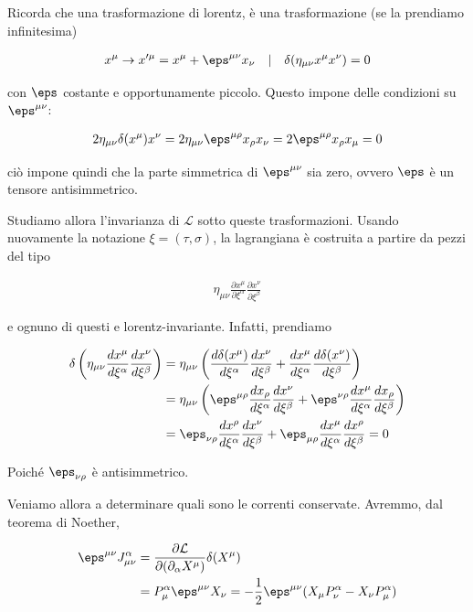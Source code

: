 \documentclass{report}
\begin{document}
Ricorda che una trasformazione di lorentz, è una trasformazione (se la prendiamo infinitesima)

\begin{align}
    x^\mu \rightarrow x'^\mu = x^\mu + \eps^{\mu\nu}x_\nu \quad | \quad \delta(\eta_{\mu\nu}x^\mu x^\nu) = 0 
\end{align}

con \(\eps\) costante e opportunamente piccolo. Questo impone delle condizioni su \(\eps^{\mu\nu}\): 

\begin{align}
    2\eta_{\mu\nu}\delta(x^\mu)x^\nu = 2\eta_{\mu\nu}\eps^{\mu\rho}x_\rho x_\nu = 2 \eps^{\mu\rho}x_\rho x_\mu = 0 
\end{align}

ciò impone quindi che la parte simmetrica di \(\eps^{\mu\nu}\) sia zero, ovvero \(\eps\) è un tensore antisimmetrico. 

Studiamo allora l'invarianza di \(\mathcal{L}\) sotto queste trasformazioni. Usando nuovamente la notazione \(\xi = (\tau, \sigma)\), la lagrangiana è costruita a partire da pezzi del tipo 

\begin{align}
    \eta_{\mu\nu}\frac{\partial x^\mu}{\partial \xi^\alpha}\frac{\partial x^\nu}{\partial \xi^\beta}
\end{align}

e ognuno di questi e lorentz-invariante. Infatti, prendiamo 

\begin{align}
    \delta\left(\eta_{\mu\nu}\frac{dx^\mu}{d\xi^\alpha}\frac{dx^\nu}{d\xi^\beta} \right) &= \eta_{\mu\nu}\left(\frac{d\delta(x^\mu)}{d\xi^\alpha}\frac{dx^\nu}{d\xi^\beta} + \frac{dx^\mu}{d\xi^\alpha}\frac{d\delta(x^\nu)}{d\xi^\beta}\right) \\
    &= \eta_{\mu\nu}\left(\eps^{\mu\rho}\frac{dx_\rho}{d\xi^\alpha}\frac{dx^\nu}{d\xi^\beta} + \eps^{\nu\rho}\frac{dx^\mu}{d\xi^\alpha}\frac{dx_\rho}{d\xi^\beta} \right) \\
    &= \eps_{\nu\rho}\frac{dx^\rho}{d\xi^\alpha}\frac{dx^\nu}{d\xi^\beta} + \eps_{\mu\rho}\frac{dx^\mu}{d\xi^\alpha}\frac{dx^\rho}{d\xi^\beta} = 0 
\end{align}

Poiché \(\eps_{\nu\rho}\) è antisimmetrico. 

Veniamo allora a determinare quali sono le correnti conservate. Avremmo, dal teorema di Noether, 

\begin{align}
    \eps^{\mu\nu}J^\alpha_{\mu\nu} &= \frac{\partial \mathcal{L}}{\partial(\partial_\alpha X^\mu)}\delta(X^\mu) \\
    &= P^\alpha_\mu \eps^{\mu\nu}X_\nu = -\frac{1}{2}\eps^{\mu\nu}(X_\mu P_\nu^\alpha - X_\nu P^\alpha_\mu)
\end{align}
\end{document}

